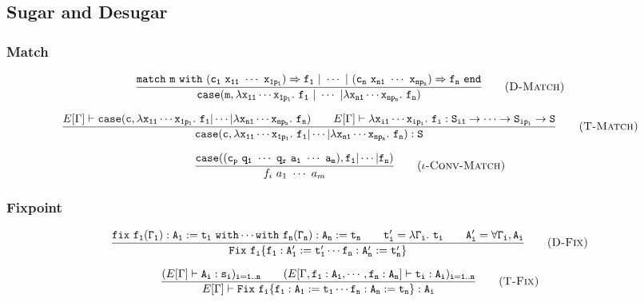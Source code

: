 \subsection{Sugar and Desugar}

\subsubsection{Match}
\begin{Def}
    \begin{equation*}
    \frac{\tt match\ m\ with\ (c_1\ x_{11}\ \cdots\ x_{1p_1})\Rightarrow f_1\ |\ \cdots\ |\ (c_n\ x_{n1}\ \cdots\ x_{np_n})
        \Rightarrow f_n\ end}
        {\tt case(m,\lambda x_{11}\cdots x_{1p_1}.\ f_1\ |\ \cdots\ |\lambda x_{n1}\cdots x_{np_n}.\ f_n)}
        \tag{\sc D-Match}
    \end{equation*}
\end{Def}

\begin{equation}
\frac{E[\Gamma]\vdash{\tt case(c,\lambda x_{11}\cdots x_{1p_1}.\ f_1|\cdots|\lambda x_{n1}\cdots x_{np_n}.\ f_n)}\qquad 
    E[\Gamma]\vdash{\tt \lambda x_{i1}\cdots x_{ip_i}.\ f_i:S_{i1}\to\cdots\to S_{ip_i}\to S}}
    {\tt case(c,\lambda x_{11}\cdots x_{1p_1}.\ f_1|\cdots|\lambda x_{n1}\cdots x_{np_n}.\ f_n):S}
    \tag{\sc T-Match}
\end{equation}

\begin{equation*}
\frac{\tt case((c_p\ q_1\ \cdots\ q_r\ a_1\ \cdots\ a_m),f_1|\cdots|f_n)}
    {f_i\ a_1\ \cdots\ a_m}
    \tag{\sc $\iota$-Conv-Match}
\end{equation*}

\subsubsection{Fixpoint}
\begin{Def}
    \begin{equation*}
    \frac{\tt fix\ f_1(\Gamma_1):A_1:=t_1\ with\cdots with\ f_n(\Gamma_n):A_n:=t_n\qquad 
        t'_i=\lambda\Gamma_i.\ t_i\qquad A'_i=\forall\Gamma_i,A_i}
        {\tt Fix\ f_i\{f_1:A'_1:=t'_1\cdots f_n:A'_n:=t'_n\}}
        \tag{\sc D-Fix}
    \end{equation*}
\end{Def}

\begin{equation*}
\frac{(E[\Gamma]\vdash {\tt A_i:s_i)_{i=1..n}}\qquad (E[\Gamma,\tt f_1:A_1,\cdots,f_n:A_n]\vdash t_i:A_i)_{i=1..n}}
    {E[\Gamma]\vdash\tt Fix\ f_i\{f_1:A_1:=t_1\cdots f_n:A_n:=t_n\}:A_i}
    \tag{\sc T-Fix}
\end{equation*}

